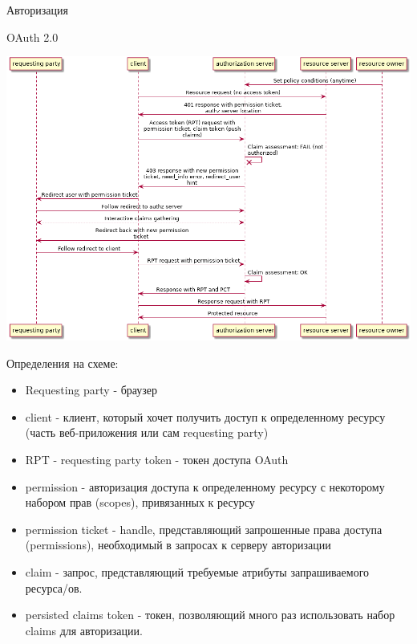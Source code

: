 \documentclass[presentation]{beamer}
\begin{document}
\begin{frame}[label={sec:orga7be39e}]{Авторизация}
\begin{block}{OAuth 2.0}
\begin{center}
\includegraphics[width=.9\linewidth]{img/uma.png}
\end{center}

\begin{block}{Определения на схеме:}
\begin{itemize}
\item Requesting party - браузер
\item client - клиент, который хочет получить доступ к определенному ресурсу (часть веб-приложения или сам requesting party)
\item RPT - requesting party token - токен доступа OAuth
\item permission - авторизация доступа к определенному ресурсу с некоторому набором прав (scopes), привязанных к ресурсу
\item permission ticket - handle, представляющий запрошенные права доступа (permissions), необходимый в запросах к серверу авторизации
\item claim - запрос, представляющий требуемые атрибуты запрашиваемого ресурса/ов.
\item persisted claims token - токен, позволяющий много раз использовать набор claims для авторизации.
\end{itemize}
\end{block}
\end{block}
\end{frame}
\end{document}
